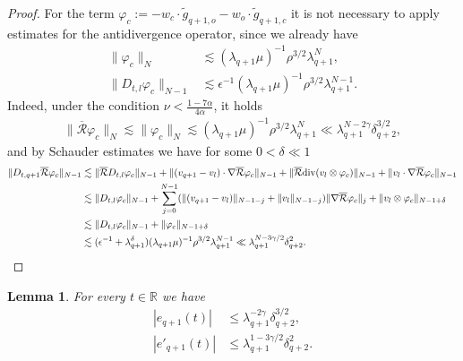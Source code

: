 \documentclass[10pt,a4paper]{amsart}
\numberwithin{equation}{section}
\numberwithin{corollario}{section}
\newtheorem{lemma}{Lemma}
\numberwithin{lemma}{section}
\numberwithin{prop}{section}
\theoremstyle{definition}
\theoremstyle{remark}
\newcommand{\R}{\mathbb{R}}
\newcommand{\dvg}{\mathord{{\rm div}}}
\newcommand{\qq}{_{q+1}}
\newcommand{\qqq}{_{q+2}}
\begin{document}
\begin{proof}
For the term $\varphi_c:=-w_c \cdot \tilde{g}_{q+1,o}-w_o \cdot \tilde{g}_{q+1,c}$ it is not necessary to apply estimates for the antidivergence operator, since we already have
\begin{align} \label{e:varphiG}
  \| \varphi_c \|_N 
    &\lesssim
    (\lambda\qq \mu)^{-1} \rho^{3/2}  \lambda\qq^N,
    \\
    \|D_{t,l} \varphi_c \|_{N-1} \label{e:DvarphiG}
    &\lesssim
    \epsilon^{-1}(\lambda\qq \mu)^{-1} \rho^{3/2} \lambda\qq^{N-1}.
\end{align}
Indeed, under the condition $\nu<\frac{1-7\alpha}{4\alpha}$, it holds
\begin{align}
    \| \overline{\mathcal{R}}\varphi_c \|_N
    \lesssim
    \| \varphi_c \|_N
    \lesssim
    (\lambda\qq \mu)^{-1} \rho^{3/2}  \lambda\qq^N
    \ll
    \lambda\qq ^{N-2\gamma}\delta_{q+2}^{3/2},
\end{align}
and by Schauder estimates we have for some $0 < \delta \ll 1$
\begin{align}
    \| D_{t,q+1} \overline{\mathcal{R}} \varphi_c\|_{N-1} 
    &\lesssim
    \| \overline{\mathcal{R}} D_{t,l} \varphi_c\|_{N-1}
    +
    \| (v\qq-v_l) \cdot \nabla \overline{\mathcal{R}} \varphi_c\|_{N-1}
    +
    \| \overline{\mathcal{R}} \dvg(v_l \otimes \varphi_c)\|_{N-1}
    +
    \|v_l \cdot \nabla \overline{\mathcal{R}}\varphi_c\|_{N-1}
    \\
    &\lesssim 
    \| D_{t,l} \varphi_c\|_{N-1}
    +
    \sum_{j=0}^{N-1}
    (\| (v\qq-v_l)\|_{N-1-j} + \|v_l \|_{N-1-j} ) \|\nabla \overline{\mathcal{R}} \varphi_c\|_{j}
    +
    \| v_l \otimes \varphi_c\|_{N-1+\delta}
    \\
    &\lesssim 
    \| D_{t,l} \varphi_c\|_{N-1}
    +
  \| \varphi_c\|_{N-1+\delta}
  \\
  &\lesssim
  (\epsilon^{-1}+\lambda\qq^{\delta} )(\lambda\qq \mu)^{-1} \rho^{3/2} \lambda\qq^{N-1} 
  \ll
  \lambda_{q+1}^{N-3\gamma/2} \delta\qqq^{2}.
\end{align}
\end{proof}
\begin{lemma} \label{lem:E'}
For every $t \in \R$ we have
  \begin{align}
   |e\qq (t)| 
  &\leq \lambda_{q+1}^{-2\gamma} \delta\qqq^{3/2},
   \\
   |e'\qq (t)| 
  &\leq \lambda_{q+1}^{1-3\gamma/2} \delta\qqq^{2}.  
  \end{align}  
\end{lemma}
\end{document}
